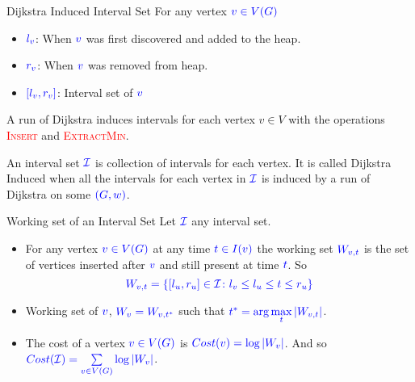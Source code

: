 \documentclass[10pt]{beamer}
\begin{document}
\begin{frame}{Dijkstra Induced Interval Set}
	For any vertex $\mathcolor{blue}{v\in V(G)}$\begin{itemize}
		\item $\mathcolor{blue}{l_v}$: When $\mathcolor{blue}{v}$ was first discovered and added to the heap.
		\item $\mathcolor{blue}{r_v}$: When $\mathcolor{blue}{v}$ was removed from heap.
		\item $\mathcolor{blue}{[l_v,r_v]}$: Interval set of $\mathcolor{blue}{v}$
	\end{itemize} \pause \vfill

	A run of Dijkstra induces intervals for each vertex $v\in V$ with the operations \textcolor{red}{\textsc{Insert}} and \textcolor{red}{\textsc{ExtractMin}}.\pause  \vfill

	An interval set $\mathcolor{blue}{\mathcal{I}}$ is collection of intervals for each vertex. It is called Dijkstra Induced when all the intervals for each vertex in $\mathcolor{blue}{\mathcal{I}}$ is induced by a run of Dijkstra on some $\mathcolor{blue}{(G,w)}$.
\end{frame}
\begin{frame}{Working set of an Interval Set}
	Let $\mathcolor{blue}{\mathcal{I}}$ any interval set.\pause

	\begin{itemize}
		\item For any vertex $\mathcolor{blue}{v\in V(G)}$ at any time $\mathcolor{blue}{t\in I(v)}$ the working set $\mathcolor{blue}{W_{v,t}}$ is the set of vertices inserted after $\mathcolor{blue}{v}$ and still present at time $\mathcolor{blue}{t}$. So $$\mathcolor{blue}{W_{v,t}=\{[l_u,r_u]\in\mathcal{I}\colon l_v\leq l_u\leq t\leq r_u\}}$$\pause \vfill
		\item Working set of $\mathcolor{blue}{v}$, $\mathcolor{blue}{W_v=W_{v,t^*}}$ such that $\mathcolor{blue}{t^*=\arg\max\limits_t|W_{v,t}|}$.\pause  \vfill
		\item The cost of a vertex $\mathcolor{blue}{v\in V(G)}$ is $\mathcolor{blue}{Cost(v)=\log|W_v|}$. And so $\mathcolor{blue}{Cost(\mathcal{I})=\sum\limits_{v\in V(G)} \log |W_v|}$.
	\end{itemize}
\end{frame}
\end{document}
